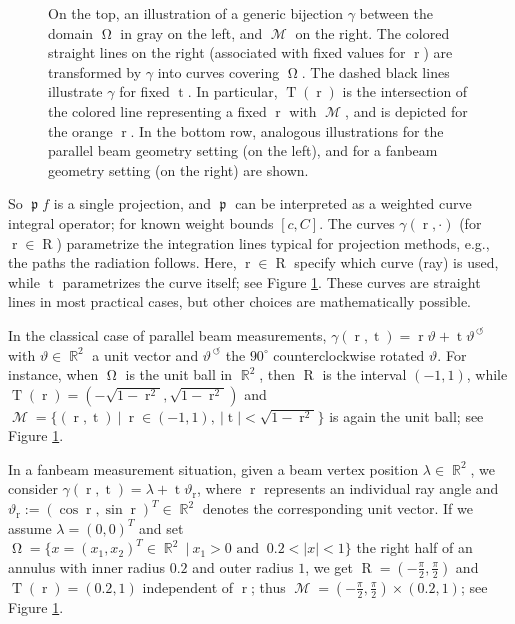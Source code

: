 \documentclass[12pt]{article}
\DeclareMathOperator{\RR}{{\mathbb{R}}}
\DeclareMathOperator{\Projind}{\mathfrak{p}}
\DeclareMathOperator{\rotated}{\,\circlearrowleft}
\DeclareMathOperator{\tvariable}{t}
\DeclareMathOperator{\tgroundset}{T}
\DeclareMathOperator{\rayvariable}{r}
\DeclareMathOperator{\raygroundset}{R}
\DeclareMathOperator{\imgdom}{{\Omega}}
\DeclareMathOperator{\gammagroundset}{{\mathcal M}}
\begin{document}
\begin{figure}
\caption{On the top, an illustration of a generic bijection $\gamma$ between the domain $\imgdom$ in gray on the left, and $\gammagroundset$ on the right.  The colored straight lines on the right (associated with fixed values for $\rayvariable$) are transformed by $\gamma$ into curves covering $\imgdom$. The dashed black lines illustrate $\gamma$ for fixed $\tvariable$. In particular, $\tgroundset(\rayvariable)$ is the intersection of the colored line representing a fixed $\rayvariable$ with $\gammagroundset$, and is depicted for the orange $\rayvariable$.
In the bottom row, analogous illustrations for the parallel beam geometry setting (on the left), and for a fanbeam geometry setting (on the right) are shown.
}
\label{fig_general_illustration_gamma}
\end{figure}

So $\Projind f$ is a single projection, and $\Projind$ can be interpreted as a weighted curve integral operator; for known weight bounds $[c,C]$.
The curves $\gamma(\rayvariable,\cdot)$ (for $\rayvariable \in \raygroundset$) parametrize the integration lines typical for projection methods, e.g., the paths the radiation follows. Here, $\rayvariable \in \raygroundset$ specify which curve (ray) is used, while $\tvariable$ parametrizes the curve itself; see Figure \ref{fig_general_illustration_gamma}.
These curves are straight lines in most practical cases, but other choices are mathematically possible.


In the classical case of parallel beam measurements, $\gamma(\rayvariable,\tvariable)=\rayvariable\vartheta+\tvariable\vartheta^{\rotated}$ with $\vartheta\in \RR^2$ a unit vector and $\vartheta^{\rotated}$ the $90^\circ$ counterclockwise rotated $\vartheta$.
For instance, when $\imgdom$ is the unit ball in $\RR^2$, then $\raygroundset$ is the interval $(-1,1)$, while $\tgroundset(\rayvariable)= (-\sqrt{1-\rayvariable^2},\sqrt{1-\rayvariable^2})$ and $\gammagroundset=\{ (\rayvariable,\tvariable)\ \big | \ \rayvariable \in (-1,1),\  |\tvariable|<\sqrt{1-\rayvariable^2}\}$ is again the unit ball; see Figure \ref{fig_general_illustration_gamma}. %

In a fanbeam measurement situation, given a beam vertex position $\lambda \in \RR^2$, we consider $\gamma(\rayvariable,\tvariable)=\lambda+\tvariable \vartheta_{\rayvariable}$, where $\rayvariable$ represents an individual ray angle and $\vartheta_{\rayvariable}:=(\cos \rayvariable,\sin\rayvariable)^T\in \RR^2$ denotes the corresponding unit vector. 
If we assume $\lambda=(0,0)^T$ and set $\imgdom= \{x=(x_1,x_2)^T\in \RR^2 \ \big | \ x_1>0 \text{ and } \ 0.2<|x|<1\}$ the right half of an annulus with inner radius $0.2$ and outer radius $1$, we get $\raygroundset=(-\frac{\pi}{2},\frac{\pi}{2})$ and $\tgroundset(\rayvariable)= (0.2,1)$ independent of $\rayvariable$; thus $\gammagroundset=(-\frac{\pi}{2},\frac{\pi}{2}) \times (0.2,1)$; see Figure \ref{fig_general_illustration_gamma}.  
\end{document}
